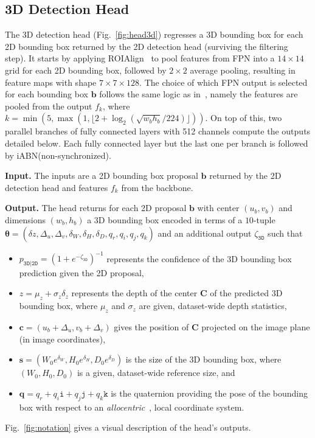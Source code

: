 \documentclass[10pt,twocolumn,letterpaper]{article}
\newcommand{\vct}[1]{\ensuremath{\boldsymbol{#1}}}
\newcommand{\mat}[1]{\mathtt{#1}}
\newcommand{\iABN}{iABN\xspace}
\renewcommand{\paragraph}[1]{

        \vspace{3pt}
	\noindent\textbf{#1}}
\begin{document}
\subsection{3D Detection Head}\label{sec:head3D}
The 3D detection head (Fig.~\ref{fig:head3d}) regresses a 3D bounding box for each 2D bounding box returned by the 2D detection head (surviving the filtering step). It starts by applying ROIAlign~\cite{He2017} to pool features from FPN into a $14\times 14$ grid for each 2D bounding box, followed by $2\times 2$ average pooling, resulting in feature maps with shape $7\times 7\times 128$.
The choice of which FPN output is selected for each bounding box $\vct b$ follows the same logic as in~\cite{Lin2016}, namely the features are pooled from the output $f_k$, where $k=\min(5,\max(1,\lfloor 2 + \log_2(\sqrt{w_bh_b}/224) \rfloor))$.
On top of this, two parallel branches of fully connected layers with 512 channels compute the outputs detailed below. Each fully connected layer but the last one per branch is followed by \iABN (non-synchronized).

\paragraph{Input.} The inputs are a 2D bounding box proposal $\vct b$ returned by the 2D detection head and features $f_k$ from the backbone.

\paragraph{Output.} The head returns for each 2D proposal $\vct b$ with center $(u_b, v_b)$ and dimensions $(w_b, h_b)$  a 3D bounding box encoded in terms of a $10$-tuple $\vct \theta=(\delta z, \Delta_u, \Delta_v, \delta_W, \delta_H, \delta_D, q_r, q_i, q_j, q_k)$ and an additional output $\zeta_\mathtt{3D}$ such that
\begin{itemize}
    \item $p_\mathtt{3D|2D}=(1+e^{-\zeta_\mat{3D}})^{-1}$ represents the confidence of the 3D bounding box prediction given the 2D proposal,
    \item $z=\mu_z+\sigma_z\delta_z$ represents the depth of the center $\vct C$ of the predicted 3D bounding box, where $\mu_z$ and $\sigma_z$ are given, dataset-wide depth statistics, 
    \item $\vct c=(u_b+\Delta_u, v_b+\Delta_v)$ gives the position of $\vct C$ projected on the image plane (in image coordinates),
    \item $\vct s=(W_0 e^{\delta_W}, H_0 e^{\delta_H},D_0 e^{\delta_D})$ is the size of the 3D bounding box, where $(W_0, H_0, D_0)$ is a given, dataset-wide reference size, and
    \item $\vct q=q_r+q_i\mat i +q_j\mat j +q_k\mat k$ is the quaternion providing the pose of the bounding box with respect to an \emph{allocentric}~\cite{Kundu_2018_CVPR}, local coordinate system.
\end{itemize}
Fig.~\ref{fig:notation} gives a visual description of the head's outputs.
\end{document}
